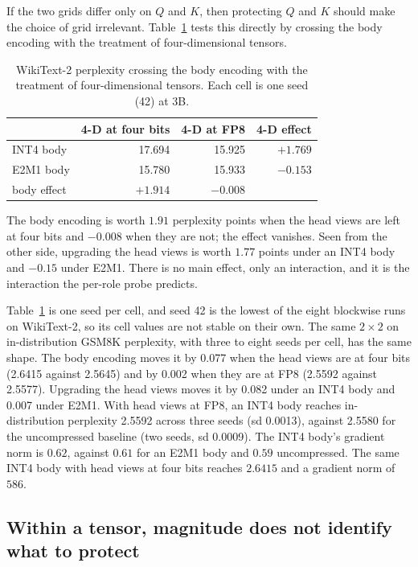 \documentclass[11pt,letterpaper]{article}
\begin{document}
\medskip
If the two grids differ only on $Q$ and $K$, then protecting $Q$ and $K$ should make the choice of grid irrelevant. Table~\ref{tab:2x2} tests this directly by crossing the body encoding with the treatment of four-dimensional tensors.

\begin{table}[htbp]
\centering
\small
\caption{WikiText-2 perplexity crossing the body encoding with the treatment of
four-dimensional tensors. Each cell is one seed (42) at 3B.}
\label{tab:2x2}
\begin{tabular}{lrrr}
\toprule
& 4-D at four bits & 4-D at FP8 & 4-D effect \\
\midrule
INT4 body & 17.694 & 15.925 & $+1.769$ \\
E2M1 body & 15.780 & 15.933 & $-0.153$ \\
\midrule
body effect & $+1.914$ & $-0.008$ & \\
\bottomrule
\end{tabular}
\end{table}

The body encoding is worth $1.91$ perplexity points when the head views are left at four bits and $-0.008$ when they are not; the effect vanishes. Seen from the other side, upgrading the head views is worth $1.77$ points under an INT4 body and $-0.15$ under E2M1. There is no main effect, only an interaction, and it is the interaction the per-role probe predicts.

Table~\ref{tab:2x2} is one seed per cell, and seed 42 is the lowest of the eight blockwise runs on WikiText-2, so its cell values are not stable on their own. The same $2 \times 2$ on in-distribution GSM8K perplexity, with three to eight seeds per cell, has the same shape. The body encoding moves it by 0.077 when the head views are at four bits (2.6415 against 2.5645) and by 0.002 when they are at FP8 (2.5592 against 2.5577). Upgrading the head views moves it by 0.082 under an INT4 body and 0.007 under E2M1. With head views at FP8, an INT4 body reaches in-distribution perplexity 2.5592 across three seeds (sd 0.0013), against 2.5580 for the uncompressed baseline (two seeds, sd 0.0009). The INT4 body's gradient norm is $0.62$, against $0.61$ for an E2M1 body and $0.59$ uncompressed. The same INT4 body with head views at four bits reaches $2.6415$ and a gradient norm of $586$.


\subsection{Within a tensor, magnitude does not identify what to protect}
\label{sec:anchor_ablation}
\end{document}
